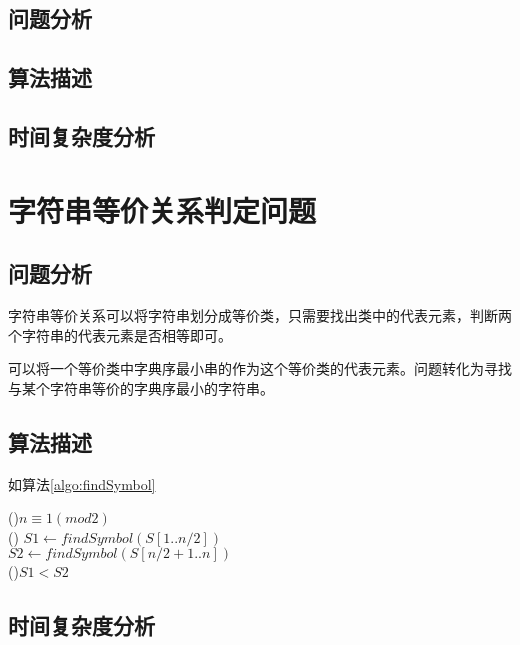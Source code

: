 \subsection*{问题分析}

\subsection*{算法描述}

\subsection*{时间复杂度分析}

\section{字符串等价关系判定问题}

\subsection*{问题分析}

字符串等价关系可以将字符串划分成等价类，只需要找出类中的代表元素，判断两个字符串的代表元素是否相等即可。

可以将一个等价类中字典序最小串的作为这个等价类的代表元素。问题转化为寻找与某个字符串等价的字典序最小的字符串。

\subsection*{算法描述}

如算法\ref{algo:findSymbol}

\begin{algorithm}
    \caption{$findSymbol(A[1..n], B[1..m],k)$}\label{algo:findSymbol}
    \If(){$n\equiv 1 (mod 2)$}{
        \\
    }\Else(){
        $S1 \leftarrow findSymbol(S[1..n/2])$\\
        $S2 \leftarrow findSymbol(S[n/2+1 .. n])$\\
        \If(){$S1 < S2$}{
        }
    }
\end{algorithm}

\subsection*{时间复杂度分析}

